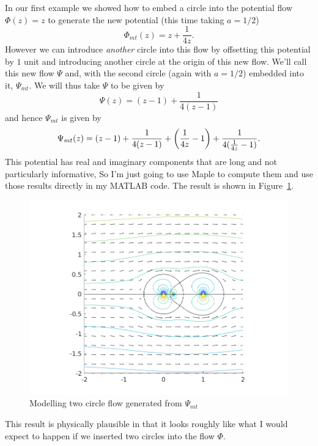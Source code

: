 \documentclass{article}
\begin{document}
In our first example we showed how to embed a circle into the potential
flow $\Phi(z) = z$ to generate the new potential (this time taking $a = 1/2$)
%
\begin{equation*}
    \Phi_{mt}(z) = z + \frac{1}{4 z}
    .
\end{equation*}
%
However we can introduce \textit{another} circle into this flow by
offsetting this potential by $1$ unit and introducing another circle at the
origin of this new flow. We'll call this new flow $\Psi$ and, with the
second circle (again with $a = 1/2$) embedded into it, $\Psi_{mt}$. We
will thus take $\Psi$ to be given by
%
\begin{equation*}
    \Psi(z) = (z - 1) + \frac{1}{4 (z - 1)}
\end{equation*}
%
and hence $\Psi_{mt}$ is given by
%
\begin{equation*}
    \Psi_{mt}(z)
        = (z - 1) + \frac{1}{4 (z - 1)}
        + \del{\frac{1}{4z} - 1} + \frac{1}{4 (\frac{1}{4z} - 1)}
        .
\end{equation*}
%
This potential has real and imaginary components that are long and not
particularly informative, So I'm just going to use Maple to compute them
and use those results directly in my MATLAB code. The result is shown in
Figure~\ref{fig:mt-6}.
%
\begin{figure}[ht]
    \includegraphics[width=35em]{mt_ex3_1}
    \centering
    \caption{Modelling two circle flow generated from $\Psi_{mt}$}
    \label{fig:mt-6}
\end{figure}
%
This result is physically plausible in that it looks roughly like what I
would expect to happen if we inserted two circles into the flow $\Phi$.
\end{document}
